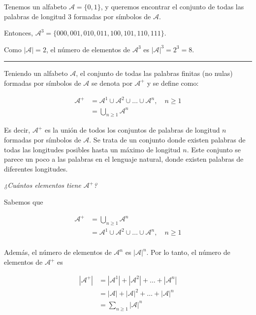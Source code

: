 Tenemos un alfabeto \(\mathcal{A}=\{0,1\}\), y queremos encontrar el
conjunto de todas las palabras de longitud 3 formadas por símbolos de
\(\mathcal{A}\).

Entonces, \(\mathcal{A}^3=\{000,001,010,011,100,101,110,111\}\).

Como \(|\mathcal{A}|=2\), el número de elementos de \(\mathcal{A}^3\) es
\(|\mathcal{A}|^3=2^3=8\).

\begin{center}\rule{0.5\linewidth}{0.5pt}\end{center}

Teniendo un alfabeto \(\mathcal{A}\), el conjunto de todas las palabras
finitas (no nulas) formadas por símbolos de \(\mathcal{A}\) se denota
por \(\mathcal{A}^+\) y se define como:


\begin{align*}
\mathcal{A}^+&=\mathcal{A}^1\cup\mathcal{A}^2\cup\dots\cup\mathcal{A}^n,\quad n\geq1\\
&= \bigcup_{n\geq1}\mathcal{A}^n
\end{align*}


Es decir, \(\mathcal{A}^+\) es la unión de todos los conjuntos de
palabras de longitud \(n\) formadas por símbolos de \(\mathcal{A}\). Se
trata de un conjunto donde existen palabras de todas las longitudes
posibles hasta un máximo de longitud \(n\). Este conjunto se parece un
poco a las palabras en el lenguaje natural, donde existen palabras de
diferentes longitudes.

\emph{¿Cuántos elementos tiene \(\mathcal{A}^+\)?}

Sabemos que


\begin{align*}
\mathcal{A}^+&= \bigcup_{n\geq1}\mathcal{A}^n\\
&=\mathcal{A}^1\cup\mathcal{A}^2\cup\dots\cup\mathcal{A}^n,\quad n\geq1\\
\end{align*}


Además, el número de elementos de \(\mathcal{A}^n\) es
\(|\mathcal{A}|^n\). Por lo tanto, el número de elementos de
\(\mathcal{A}^+\) es


\begin{align*}
|\mathcal{A}^+|&=|\mathcal{A}^1|+|\mathcal{A}^2|+\dots+|\mathcal{A}^n|\\
&=|\mathcal{A}|+|\mathcal{A}|^2+\dots+|\mathcal{A}|^n\\
&=\sum_{n\geq1}|\mathcal{A}|^n
\end{align*}


